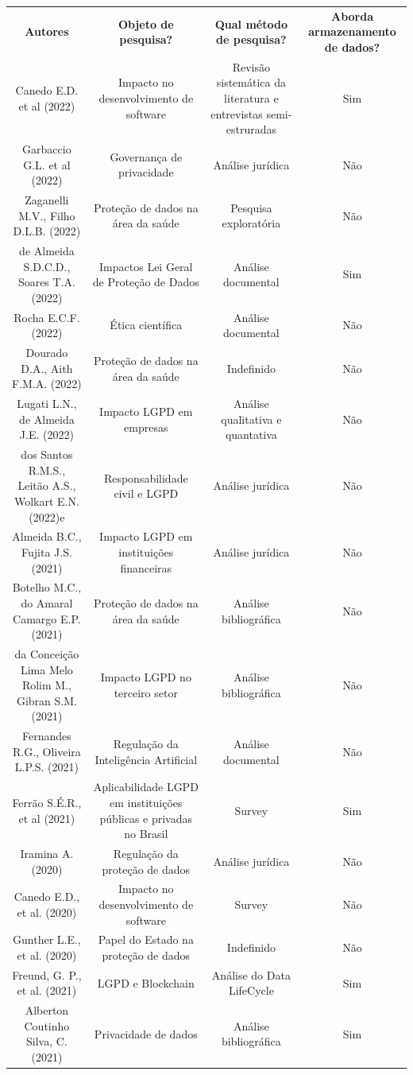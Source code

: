 \begin{table}
\centering

\begin{tabular}{cccc}
\textbf{\textbf{Autores}} & \textbf{\textbf{Objeto de pesquisa? }} & \textbf{\textbf{Qual método de pesquisa? }} & \textbf{\textbf{Aborda armazenamento de dados?}} \\
Canedo E.D. et al (2022) & Impacto no desenvolvimento de software & Revisão sistemática da literatura e entrevistas semi-estruradas & Sim \\
Garbaccio G.L. et al (2022) & Governança de privacidade & Análise jurídica & Não \\
Zaganelli M.V., Filho D.L.B. (2022) & Proteção de dados na área da saúde & Pesquisa exploratória & Não \\
de Almeida S.D.C.D., Soares T.A. (2022) & Impactos Lei Geral de Proteção de Dados & Análise documental & Sim \\
Rocha E.C.F. (2022) & Ética científica & Análise documental & Não \\
Dourado D.A., Aith F.M.A. (2022) & Proteção de dados na área da saúde & Indefinido & Não \\
Lugati L.N., de Almeida J.E. (2022) & Impacto LGPD em empresas & Análise qualitativa e quantativa & Não \\
dos Santos R.M.S., Leitão A.S., Wolkart E.N. (2022)e & Responsabilidade civil e LGPD & Análise jurídica & Não \\
Almeida B.C., Fujita J.S. (2021) & Impacto LGPD em instituições financeiras & Análise jurídica & Não \\
Botelho M.C., do Amaral Camargo E.P. (2021) & Proteção de dados na área da saúde & Análise bibliográfica & Não \\
da Conceição Lima Melo Rolim M., Gibran S.M. (2021) & Impacto LGPD no terceiro setor & Análise bibliográfica & Não \\
Fernandes R.G., Oliveira L.P.S. (2021) & Regulação da Inteligência Artificial & Análise documental & Não \\
Ferrão S.É.R., et al (2021) & Aplicabilidade LGPD em instituições públicas e privadas no Brasil & Survey & Sim \\
Iramina A. (2020) & Regulação da proteção de dados  & Análise jurídica & Não \\
Canedo E.D., et al. (2020) & Impacto no desenvolvimento de software & Survey & Não \\
Gunther L.E., et al. (2020) & Papel do Estado na proteção de dados & Indefinido & Não \\
Freund, G. P., et al. (2021) & LGPD e Blockchain & Análise do Data LifeCycle & Sim \\
Alberton Coutinho Silva, C. (2021) & Privacidade de dados & Análise bibliográfica & Sim \\

\end{tabular}

\end{table}

